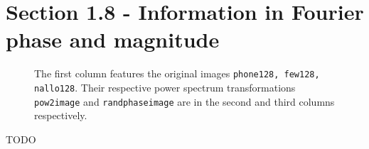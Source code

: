 \section{Section 1.8 - Information in Fourier phase and magnitude}

\begin{figure}[H]
	
	\caption{The first column features the original images \texttt{phone128, few128, nallo128}. Their respective power spectrum transformations
	\texttt{pow2image} and \texttt{randphaseimage} are in the second and third columns respectively.}
	\label{fig:Q13}
\end{figure}


TODO